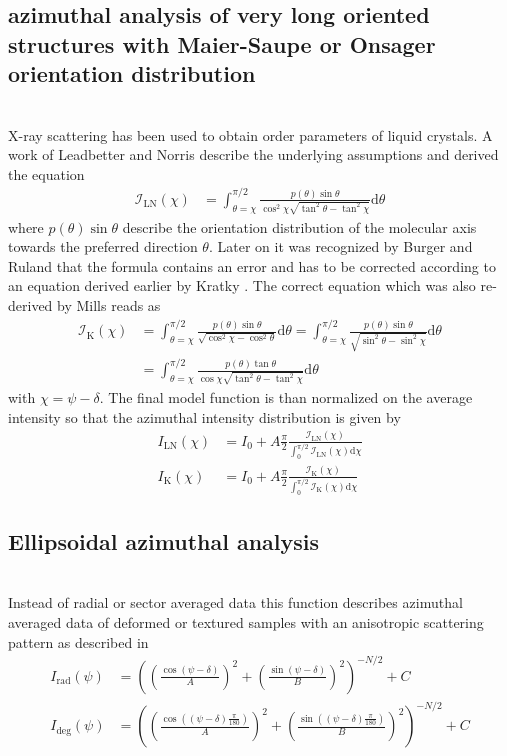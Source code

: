 \subsection{azimuthal analysis of very long oriented structures with Maier-Saupe or Onsager orientation distribution} ~\\
X-ray scattering has been used to obtain order parameters of liquid crystals. A work of Leadbetter and Norris \cite{Leadbetter1979} describe the underlying assumptions and derived the equation
\begin{align}
\mathcal{I}_\mathrm{LN}(\chi) &= \int_{\theta=\chi}^{\pi/2} \frac{p(\theta) \sin\theta}{\cos^2\chi \sqrt{\tan^2\theta-\tan^2\chi}} \mathrm{d}\theta
\end{align}
where $p(\theta) \sin\theta$ describe the orientation distribution of the molecular axis towards the preferred direction $\theta$. Later on it was recognized by Burger and Ruland \cite{Burger2006} that the formula contains an error and has to be corrected according to an equation derived earlier by Kratky \cite{Kratky1933}. The correct equation  which was also re-derived by Mills \cite{Mills2008} reads as \cite{Sims2018,Agra-Kooijman2017}
\begin{align}
\mathcal{I}_\mathrm{K}(\chi) &= \int_{\theta=\chi}^{\pi/2} \frac{p(\theta) \sin\theta}{\sqrt{\cos^2\chi-\cos^2\theta}} \mathrm{d}\theta = \int_{\theta=\chi}^{\pi/2} \frac{p(\theta) \sin\theta}{\sqrt{\sin^2\theta-\sin^2\chi}} \mathrm{d}\theta\\
&= \int_{\theta=\chi}^{\pi/2} \frac{p(\theta) \tan\theta}{\cos\chi \sqrt{\tan^2\theta-\tan^2\chi}} \mathrm{d}\theta
\end{align}
with $\chi = \psi-\delta$.  The final model function is than normalized on the average intensity so that the azimuthal intensity distribution is given by
\begin{align}
  I_\mathrm{LN}(\chi) &= I_0 + A \frac{\pi}{2}\frac{\mathcal{I}_\mathrm{LN}(\chi)}{\int_0^{\pi/2}\mathcal{I}_\mathrm{LN}(\chi)\mathrm{d}\chi} \\
  I_\mathrm{K}(\chi) &= I_0 + A \frac{\pi}{2}\frac{\mathcal{I}_\mathrm{K}(\chi)}{\int_0^{\pi/2}\mathcal{I}_\mathrm{K}(\chi)\mathrm{d}\chi}
\end{align}

\subsection{Ellipsoidal azimuthal analysis} ~\\
Instead of radial or sector averaged data this function describes azimuthal averaged data of deformed or textured samples with an anisotropic scattering pattern as described in
\cite{Summerfield1983,Mildner1983,Reynolds1984,Hammouda1986,Hammouda1986a,Saraf1989,Svetogorsky1990,Gu2016,Gu2018}
\begin{align}
I_\mathrm{rad}(\psi) &= \left(\left(\frac{\cos(\psi-\delta)}{A}\right)^2 + \left(\frac{\sin(\psi-\delta)}{B}\right)^2\right)^{-N/2} +C\\
I_\mathrm{deg}(\psi) &= \left(\left(\frac{\cos\left((\psi-\delta)\frac{\pi}{180}\right)}{A}\right)^2 + \left(\frac{\sin\left((\psi-\delta)\frac{\pi}{180}\right)}{B}\right)^2\right)^{-N/2}+C
\end{align}
